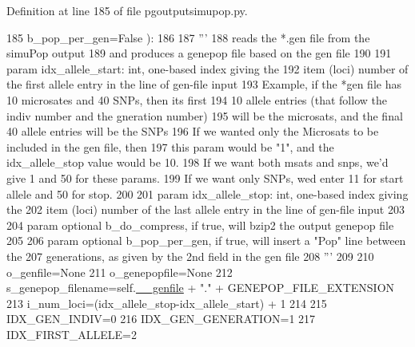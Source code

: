 Definition at line 185 of file pgoutputsimupop.\+py.


\begin{DoxyCode}
185             b\_pop\_per\_gen=\textcolor{keyword}{False} ):
186 
187         \textcolor{stringliteral}{'''}
188 \textcolor{stringliteral}{        reads the *.gen file from the simuPop output}
189 \textcolor{stringliteral}{        and produces a genepop file based on the gen file}
190 \textcolor{stringliteral}{}
191 \textcolor{stringliteral}{        param idx\_allele\_start: int, one-based index giving the}
192 \textcolor{stringliteral}{        item (loci) number of the first allele entry in the line of gen-file input}
193 \textcolor{stringliteral}{        Example, if the *gen file has 10 microsates and 40 SNPs, then its first}
194 \textcolor{stringliteral}{        10 allele entries (that follow the indiv number and the gneration number)}
195 \textcolor{stringliteral}{        will be the microsats, and the final 40 allele entries will be the SNPs}
196 \textcolor{stringliteral}{        If we wanted only the Microsats to be included in the gen file, then}
197 \textcolor{stringliteral}{        this param would be "1", and the idx\_allele\_stop value would be 10. }
198 \textcolor{stringliteral}{        If we want both msats and snps, we'd give 1 and 50 for these params. }
199 \textcolor{stringliteral}{        If we want only SNPs, wed enter 11 for start allele and 50 for stop.}
200 \textcolor{stringliteral}{}
201 \textcolor{stringliteral}{        param idx\_allele\_stop: int, one-based index giving the}
202 \textcolor{stringliteral}{        item (loci) number of the last allele entry in the line of gen-file input}
203 \textcolor{stringliteral}{}
204 \textcolor{stringliteral}{        param optional b\_do\_compress, if true, will bzip2 the output genepop file}
205 \textcolor{stringliteral}{}
206 \textcolor{stringliteral}{        param optional b\_pop\_per\_gen, if true, will insert a "Pop" line between the}
207 \textcolor{stringliteral}{        generations, as given by the 2nd field in the gen file}
208 \textcolor{stringliteral}{        '''}
209 
210         o\_genfile=\textcolor{keywordtype}{None}
211         o\_genepopfile=\textcolor{keywordtype}{None}
212         s\_genepop\_filename=self.\hyperlink{classnegui_1_1pgoutputsimupop_1_1PGOutputSimuPop_a30fb6b94af13efad6becfbe6fddc1d95}{\_\_genfile} + \textcolor{stringliteral}{"."} + GENEPOP\_FILE\_EXTENSION 
213         i\_num\_loci=(idx\_allele\_stop-idx\_allele\_start) + 1
214 
215         IDX\_GEN\_INDIV=0
216         IDX\_GEN\_GENERATION=1
217         IDX\_FIRST\_ALLELE=2

\end{DoxyCode}
